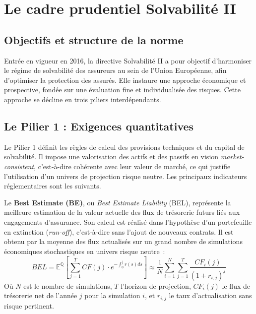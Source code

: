 \section{Le cadre prudentiel Solvabilité II}
\label{sec:s2}

\subsection{Objectifs et structure de la norme}

Entrée en vigueur en 2016, la directive Solvabilité II a pour objectif d'harmoniser le régime de solvabilité des assureurs au sein de l'Union Européenne, afin d'optimiser la protection des assurés. Elle instaure une approche économique et prospective, fondée sur une évaluation fine et individualisée des risques. Cette approche se décline en trois piliers interdépendants.

\subsection{Le Pilier 1 : Exigences quantitatives}

Le Pilier 1 définit les règles de calcul des provisions techniques et du capital de solvabilité. Il impose une valorisation des actifs et des passifs en vision \textit{market-consistent}, c'est-à-dire cohérente avec leur valeur de marché, ce qui justifie l'utilisation d'un univers de projection risque neutre. Les principaux indicateurs réglementaires sont les suivants.

\bigskip

Le \textbf{Best Estimate (BE)}, ou \textit{Best Estimate Liability} (BEL), représente la meilleure estimation de la valeur actuelle des flux de trésorerie futurs liés aux engagements d'assurance. Son calcul est réalisé dans l'hypothèse d'un portefeuille en extinction (\textit{run-off}), c'est-à-dire sans l'ajout de nouveaux contrats. Il est obtenu par la moyenne des flux actualisés sur un grand nombre de simulations économiques stochastiques en univers risque neutre~:
\begin{equation}
    BEL = \mathbb{E}^{\mathbb{Q}} \left[ \sum_{j=1}^{T} CF(j) \cdot e^{-\int_0^j r(s)ds} \right] \approx \frac{1}{N}\sum_{i=1}^{N}\sum_{j=1}^{T}\frac{CF_{i}(j)}{(1+r_{i,j})^{j}}
\end{equation}
Où $N$ est le nombre de simulations, $T$ l'horizon de projection, $CF_{i}(j)$ le flux de trésorerie net de l'année $j$ pour la simulation $i$, et $r_{i,j}$ le taux d'actualisation sans risque pertinent.

